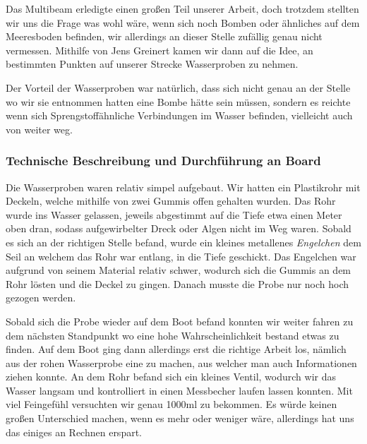  

Das Multibeam erledigte einen großen Teil unserer Arbeit, doch trotzdem stellten wir uns die Frage was wohl wäre, wenn sich noch Bomben oder ähnliches auf dem Meeresboden befinden, wir allerdings an dieser Stelle zufällig genau nicht vermessen. Mithilfe von Jens Greinert kamen wir dann auf die Idee, an bestimmten Punkten auf unserer Strecke Wasserproben zu nehmen. 

Der Vorteil der Wasserproben war natürlich, dass sich nicht genau an der Stelle wo wir sie entnommen hatten eine Bombe hätte sein müssen, sondern es reichte wenn sich Sprengstoffähnliche Verbindungen im Wasser befinden, vielleicht auch von weiter weg.  

\subsubsection{Technische Beschreibung und Durchführung an Board}
Die Wasserproben waren relativ simpel aufgebaut. Wir hatten ein Plastikrohr mit Deckeln, welche mithilfe von zwei Gummis offen gehalten wurden. Das Rohr wurde ins Wasser gelassen, jeweils abgestimmt auf die Tiefe etwa einen Meter oben dran, sodass aufgewirbelter Dreck oder Algen nicht im Weg waren. Sobald es sich an der richtigen Stelle befand, wurde ein kleines metallenes \emph{Engelchen} dem Seil an welchem das Rohr war entlang, in die Tiefe geschickt. Das Engelchen war aufgrund von seinem Material relativ schwer, wodurch sich die Gummis an dem Rohr lösten und die Deckel zu gingen. Danach musste die Probe nur noch hoch gezogen werden.

Sobald sich die Probe wieder auf dem Boot befand konnten wir weiter fahren zu dem nächsten Standpunkt wo eine hohe Wahrscheinlichkeit bestand etwas zu finden. Auf dem Boot ging dann allerdings erst die richtige Arbeit los, nämlich aus der rohen Wasserprobe eine zu machen, aus welcher man auch Informationen ziehen konnte. An dem Rohr befand sich ein kleines Ventil, wodurch wir das Wasser langsam und kontrolliert in einen Messbecher laufen lassen konnten. Mit viel Feingefühl versuchten wir genau 1000ml zu bekommen. Es würde keinen großen Unterschied machen, wenn es mehr oder weniger wäre, allerdings hat uns das einiges an Rechnen erspart. 

